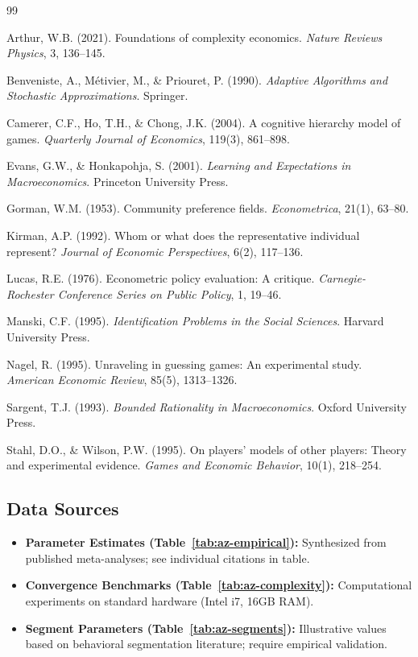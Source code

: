 \begin{thebibliography}{99}

 Arthur, W.B. (2021). Foundations of complexity economics.
\textit{Nature Reviews Physics}, 3, 136--145.

 Benveniste, A., Métivier, M., \& Priouret, P. (1990).
\textit{Adaptive Algorithms and Stochastic Approximations}. Springer.

 Camerer, C.F., Ho, T.H., \& Chong, J.K. (2004).
A cognitive hierarchy model of games. \textit{Quarterly Journal of Economics}, 119(3), 861--898.

 Evans, G.W., \& Honkapohja, S. (2001).
\textit{Learning and Expectations in Macroeconomics}. Princeton University Press.

 Gorman, W.M. (1953). Community preference fields.
\textit{Econometrica}, 21(1), 63--80.

 Kirman, A.P. (1992). Whom or what does the representative individual represent?
\textit{Journal of Economic Perspectives}, 6(2), 117--136.

 Lucas, R.E. (1976). Econometric policy evaluation: A critique.
\textit{Carnegie-Rochester Conference Series on Public Policy}, 1, 19--46.

 Manski, C.F. (1995). \textit{Identification Problems in the Social Sciences}.
Harvard University Press.

 Nagel, R. (1995). Unraveling in guessing games: An experimental study.
\textit{American Economic Review}, 85(5), 1313--1326.

 Sargent, T.J. (1993). \textit{Bounded Rationality in Macroeconomics}.
Oxford University Press.

 Stahl, D.O., \& Wilson, P.W. (1995). On players' models of other players:
Theory and experimental evidence. \textit{Games and Economic Behavior}, 10(1), 218--254.

\end{thebibliography}

\subsection{Data Sources}

\begin{itemize}[nosep]
    \item \textbf{Parameter Estimates (Table~\ref{tab:az-empirical}):} Synthesized from
    published meta-analyses; see individual citations in table.
    \item \textbf{Convergence Benchmarks (Table~\ref{tab:az-complexity}):} Computational
    experiments on standard hardware (Intel i7, 16GB RAM).
    \item \textbf{Segment Parameters (Table~\ref{tab:az-segments}):} Illustrative values
    based on behavioral segmentation literature; require empirical validation.
\end{itemize}

